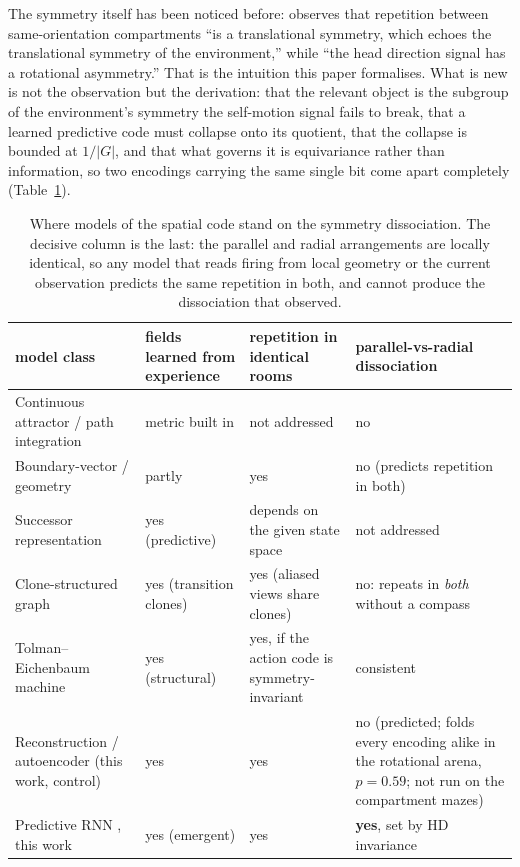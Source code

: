 The symmetry itself has been noticed before: \citet{jeffery2023} observes that repetition between
same-orientation compartments ``is a translational symmetry, which echoes the translational symmetry of
the environment,'' while ``the head direction signal has a rotational asymmetry.'' That is the intuition
this paper formalises. What is new is not the observation but the derivation: that the relevant object
is the subgroup of the environment's symmetry the self-motion signal fails to break, that a learned
predictive code must collapse onto its quotient, that the collapse is bounded at $1/|G|$, and that what
governs it is equivariance rather than information, so two encodings carrying the same single bit come
apart completely (Table~\ref{tab:models}).

\begin{table}[t]
\centering
\small
\setlength{\tabcolsep}{4pt}
\caption{Where models of the spatial code stand on the symmetry dissociation. The decisive column
is the last: the parallel and radial arrangements are locally identical, so any model that reads
firing from local geometry or the current observation predicts the same repetition in both, and
cannot produce the dissociation that \citet{grieves2016} observed.}
\label{tab:models}
\begin{tabular}{p{}p{}p{}p{}}
\toprule
model class & fields learned from experience & repetition in identical rooms &
parallel-vs-radial dissociation \\
\midrule
Continuous attractor / path integration \citep{burak2009, sorscher2023unified}
& metric built in & not addressed & no \\[3pt]
Boundary-vector / geometry \citep{hartley2000}
& partly & yes & no (predicts repetition in both) \\[3pt]
Successor representation \citep{stachenfeld2017}
& yes (predictive) & depends on the given state space & not addressed \\[3pt]
Clone-structured graph \citep{george2021,raju2024}
& yes (transition clones) & yes (aliased views share clones) & no: repeats in \emph{both}
without a compass \citep{raju2024} \\[3pt]
Tolman--Eichenbaum machine \citep{whittington2020tolman}
& yes (structural) & yes, if the action code is symmetry-invariant & consistent \\[3pt]
Reconstruction / autoencoder (this work, control)
& yes & yes & no (predicted; folds every encoding alike in the rotational arena, $p=0.59$;
not run on the compartment mazes) \\[3pt]
Predictive RNN \citep{levenstein2024}, this work
& yes (emergent) & yes & \textbf{yes}, set by HD invariance \\
\bottomrule
\end{tabular}
\end{table}

